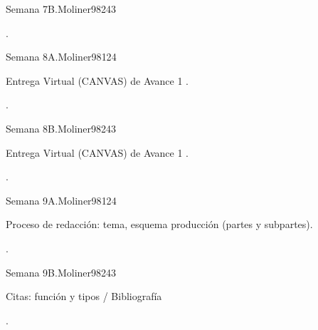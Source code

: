 \begin{syllabus}
\begin{unit}{Semana 7B.}{}{Moliner98}{24}{3}
   \begin{learningoutcomes}
      \item . 
      \end{learningoutcomes}
\end{unit}

\begin{unit}{Semana 8A.}{}{Moliner98}{12}{4}
   \begin{topics}
      \item Entrega Virtual (CANVAS) de Avance 1 .
   \end{topics}
   \begin{learningoutcomes}
      \item .
   \end{learningoutcomes}
\end{unit}

\begin{unit}{Semana 8B.}{}{Moliner98}{24}{3}
   \begin{topics}
      \item Entrega Virtual (CANVAS) de Avance 1 .
   \end{topics}

   \begin{learningoutcomes}
      \item .
      \end{learningoutcomes}
\end{unit}

\begin{unit}{Semana 9A.}{}{Moliner98}{12}{4}
   \begin{topics}
      \item Proceso de redacción: tema, esquema producción (partes y subpartes).
   \end{topics}
   \begin{learningoutcomes}
      \item .
   \end{learningoutcomes}
\end{unit}

\begin{unit}{Semana 9B.}{}{Moliner98}{24}{3}
   \begin{topics}
      \item Citas: función y tipos / Bibliografía 
   \end{topics}

   \begin{learningoutcomes}
      \item .
      \end{learningoutcomes}
\end{unit}


\end{syllabus}
